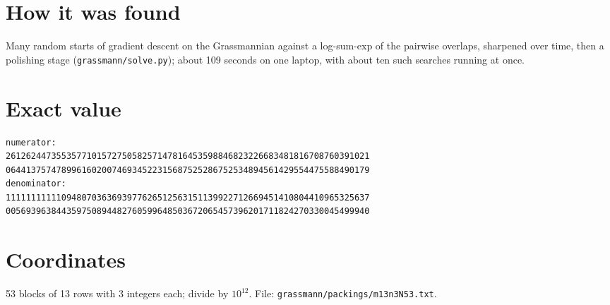 \documentclass[11pt,a4paper]{article}
\begin{document}
\section{How it was found}
Many random starts of gradient descent on the Grassmannian against a log-sum-exp of the pairwise overlaps, sharpened over time, then a polishing stage (\texttt{grassmann/solve.py}); about 109 seconds on one laptop, with about ten such searches running at once.


\appendix
\section{Exact value}
{\small
\begin{verbatim}
numerator:
261262447355357710157275058257147816453598846823226683481816708760391021
064413757478996160200746934522315687525286752534894561429554475588490179
denominator:
111111111110948070363693977626512563151139922712669451410804410965325637
005693963844359750894482760599648503672065457396201711824270330045499940
\end{verbatim}}

\section{Coordinates}
53 blocks of 13 rows with 3 integers each; divide by $10^{12}$. File: \texttt{grassmann/packings/m13n3N53.txt}.
{\tiny
\begin{multicols}{3}
\end{multicols}}
\end{document}
